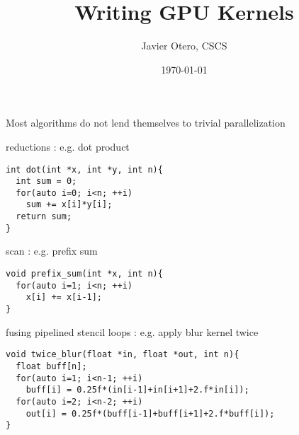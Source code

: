 \documentclass[aspectratio=43]{beamer}
\author{Javier Otero, CSCS}
\title{Writing GPU Kernels}
\subtitle{}
\date{\today}
\begin{document}
\cscstitle


\begin{frame}[fragile]{}
    \centering
    Most algorithms do not lend themselves to trivial parallelization

    \begin{code}{reductions : e.g. dot product}
        \begin{lstlisting}[style=boxcudatiny]
int dot(int *x, int *y, int n){
  int sum = 0;
  for(auto i=0; i<n; ++i)
    sum += x[i]*y[i];
  return sum;
}
        \end{lstlisting}
    \end{code}
\vspace{-7pt}
        \begin{code}{scan : e.g. prefix sum}
            \begin{lstlisting}[style=boxcudatiny]
void prefix_sum(int *x, int n){
  for(auto i=1; i<n; ++i)
    x[i] += x[i-1];
}
        \end{lstlisting}
    \end{code}
\vspace{-7pt}
    \begin{code}{fusing pipelined stencil loops : e.g. apply blur kernel twice}
        \begin{lstlisting}[style=boxcudatiny]
void twice_blur(float *in, float *out, int n){
  float buff[n];
  for(auto i=1; i<n-1; ++i)
    buff[i] = 0.25f*(in[i-1]+in[i+1]+2.f*in[i]);
  for(auto i=2; i<n-2; ++i)
    out[i] = 0.25f*(buff[i-1]+buff[i+1]+2.f*buff[i]);
}
        \end{lstlisting}
    \end{code}

\end{frame}
\end{document}
